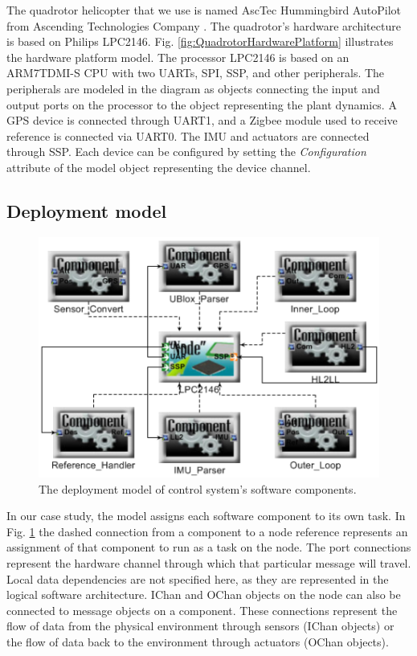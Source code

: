 \documentclass{acm_proc_article-sp}
\begin{document}
The quadrotor helicopter that we use is named AscTec Hummingbird AutoPilot from Ascending Technologies Company \cite{asctech:hummingbird}. The quadrotor's hardware architecture is based on Philips LPC2146. Fig. \ref{fig:QuadrotorHardwarePlatform} illustrates the hardware platform model. The processor LPC2146 is based on an ARM7TDMI-S CPU with two UARTs, SPI, SSP, and other peripherals. The peripherals are modeled in the diagram as objects connecting the input and output ports on the processor to the object representing the plant dynamics. A GPS device is connected through UART1, and a Zigbee module used to receive reference is connected via UART0. The IMU and actuators are connected through SSP. Each device can be configured by setting the \emph{Configuration} attribute of the model object representing the device channel. 

\subsection{Deployment model}

\begin{figure}[!t]
\centering
\includegraphics[width=0.80\columnwidth]{figures/QuadrotorDeployment.png}
\caption{The deployment model of control system's software components.}
\label{fig:QuadrotorDeployment}
\end{figure}

In our case study, the model assigns each software component to its own task. In Fig. \ref{fig:QuadrotorDeployment} the dashed connection from a component to a node reference represents an assignment of that component to run as a task on the node. The port connections represent the hardware channel through which that particular message will travel. Local data dependencies are not specified here, as they are represented in the logical software architecture. IChan and OChan objects on the node can also be connected to message objects on a component. These connections represent the flow of data from the physical environment through sensors (IChan objects) or the flow of data back to the environment through actuators (OChan objects).
\end{document}

